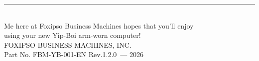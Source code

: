 \documentclass[10pt]{article}
\newcommand{\manualversion}{1.2.0}
\begin{document}
\vfill
\begin{center}
\textcolor{rulecolor}{\rule{0.5\textwidth}{0.8pt}}\\[0.5em]
{\footnotesize\ttfamily
Me here at Foxipso Business Machines hopes that you'll enjoy\\
using your new Yip-Boi arm-worn computer!\\[0.5em]
FOXIPSO BUSINESS MACHINES, INC.\\[0.3em]
Part No. FBM-YB-001-EN Rev.\manualversion\ --- 2026}
\end{center}
\end{document}
